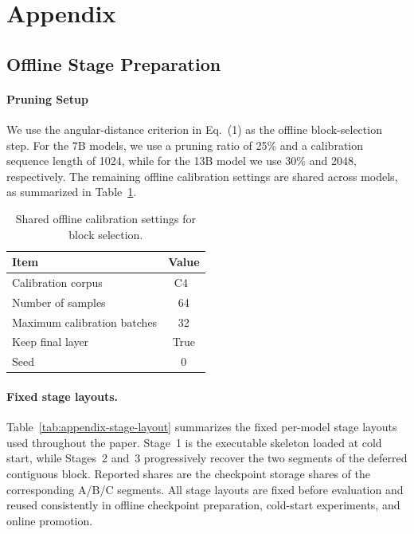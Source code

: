 \documentclass[sigplan,anonymous,review,nonacm]{acmart}
\begin{document}
\FloatBarrier
\section{Appendix}

\subsection{Offline Stage Preparation}
\paragraph{Pruning Setup}
We use the angular-distance criterion in Eq.~(1) as the offline
block-selection step. For the 7B models, we use a pruning ratio
of 25\% and a calibration sequence length of 1024, while for the
13B model we use 30\% and 2048, respectively. The remaining
offline calibration settings are shared across models, as summarized
in Table~\ref{tab:offline_calibration}.

\begin{table}[t]
\centering
\caption{Shared offline calibration settings for block selection.}
\label{tab:offline_calibration}
\begin{tabular}{lc}
\toprule
Item & Value \\
\midrule
Calibration corpus & C4~\cite{raffel2020t5} \\
Number of samples & 64 \\
Maximum calibration batches & 32 \\
Keep final layer & True \\
Seed & 0 \\
\bottomrule
\end{tabular}
\end{table}



\paragraph{Fixed stage layouts.}
Table~\ref{tab:appendix-stage-layout} summarizes the fixed per-model stage
layouts used throughout the paper. Stage~1 is the executable skeleton
loaded at cold start, while Stages~2 and~3 progressively recover the
two segments of the deferred contiguous block. Reported shares are the
checkpoint storage shares of the corresponding A/B/C segments. All
stage layouts are fixed before evaluation and reused consistently in
offline checkpoint preparation, cold-start experiments, and online
promotion.
\end{document}
